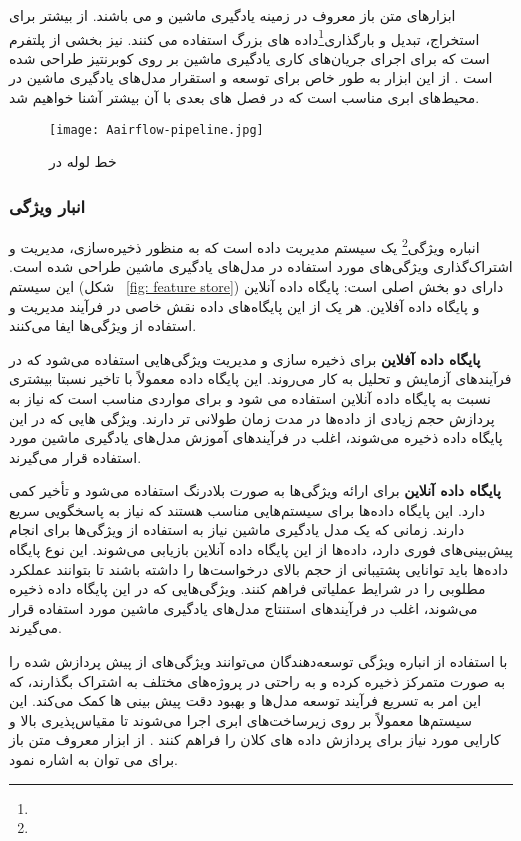 ابزارهای متن باز معروف در زمینه یادگیری ماشین \cite{Airflow} و  می باشند. از  بیشتر برای استخراج، تبدیل و بارگذاری\footnote{}داده های بزرگ استفاده می کنند.  نیز بخشی از پلتفرم \cite{Kubeflow} است که برای اجرای جریان‌های کاری یادگیری ماشین بر روی کوبرنتیز طراحی شده است \cite{MLOpsWFCOMP1}. از این ابزار به طور خاص برای توسعه و استقرار مدل‌های یادگیری ماشین در محیط‌های ابری مناسب است که در فصل های بعدی با آن بیشتر آشنا خواهیم شد.	

\begin{figure}[t]
	\centering
	\texttt{[image: Aairflow-pipeline.jpg]}
	\caption{خط لوله در }
	\label{fig: airflow pipelines}
\end{figure}

\subsubsection{انبار ویژگی}
انباره ویژگی\footnote{} یک سیستم مدیریت داده است که به منظور ذخیره‌سازی، مدیریت و اشتراک‌گذاری ویژگی‌های مورد استفاده در مدل‌های یادگیری ماشین طراحی شده است. این سیستم (شکل 
~\ref{fig: feature store})
دارای دو بخش اصلی است: پایگاه داده آنلاین و پایگاه داده آفلاین. هر یک از این پایگاه‌های داده نقش خاصی در فرآیند مدیریت و استفاده از ویژگی‌ها ایفا می‌کنند.

\textbf{پایگاه داده آفلاین}
برای ذخیره ‌سازی و مدیریت ویژگی‌هایی استفاده می‌شود که در فرآیندهای آزمایش و تحلیل به کار می‌روند. این پایگاه داده معمولاً با تاخیر نسبتا بیشتری نسبت به پایگاه داده آنلاین استفاده می شود و برای مواردی مناسب است که نیاز به پردازش حجم زیادی از داده‌ها در مدت زمان طولانی ‌تر دارند. ویژگی ‌هایی که در این پایگاه داده ذخیره می‌شوند، اغلب در فرآیندهای آموزش مدل‌های یادگیری ماشین مورد استفاده قرار می‌گیرند.

\textbf{پایگاه داده آنلاین}
برای ارائه ویژگی‌ها به صورت بلادرنگ استفاده می‌شود و تأخیر کمی دارد. این پایگاه داده‌ها برای سیستم‌هایی مناسب هستند که نیاز به پاسخگویی سریع دارند. زمانی که یک مدل یادگیری ماشین نیاز به استفاده از ویژگی‌ها برای انجام پیش‌بینی‌های فوری دارد، داده‌ها از این پایگاه داده آنلاین بازیابی می‌شوند. این نوع پایگاه داده‌ها باید توانایی پشتیبانی از حجم بالای درخواست‌ها را داشته باشند تا بتوانند عملکرد مطلوبی را در شرایط عملیاتی فراهم کنند. ویژگی‌هایی که در این پایگاه داده ذخیره می‌شوند، اغلب در فرآیندهای استنتاج مدل‌های یادگیری ماشین مورد استفاده قرار می‌گیرند.


با استفاده از انباره ویژگی توسعه‌دهندگان می‌توانند ویژگی‌های از پیش پردازش شده را به صورت متمرکز ذخیره کرده و به راحتی در پروژه‌های مختلف به اشتراک بگذارند، که این امر به تسریع فرآیند توسعه مدل‌ها و بهبود دقت پیش بینی ها کمک می‌کند. این سیستم‌ها معمولاً بر روی زیرساخت‌های ابری اجرا می‌شوند تا مقیاس‌پذیری بالا و کارایی مورد نیاز برای پردازش داده های کلان را فراهم کنند \cite{MLOpsCT2}. از ابزار معروف متن باز برای می توان به \cite{Feast} اشاره نمود.

